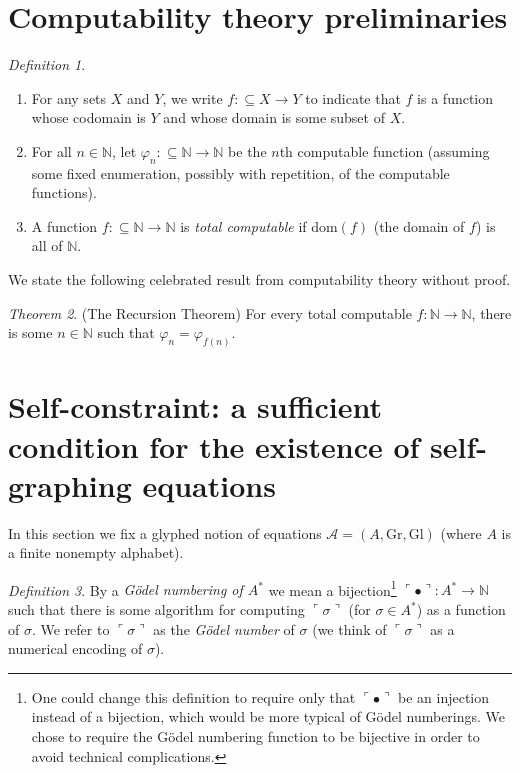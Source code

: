 \documentclass[table, svgnames, dvipsnames, letterpaper, 11pt]{report}
\theoremstyle{remark}
\newtheorem{theorem}{Theorem}
\newtheorem{definition}[theorem]{Definition}
\begin{document}
\section{Computability theory preliminaries}

\begin{definition}
  \begin{enumerate}
    \item
    For any sets $X$ and $Y$, we write $f:{\subseteq}X\to Y$ to indicate
    that $f$ is a function whose codomain is $Y$ and whose domain is
    some subset of $X$.
    \item
    For all $n\in\mathbb N$,
    let $\varphi_n:{\subseteq}\mathbb N\to \mathbb N$
    be the $n$th computable function
    (assuming some fixed enumeration, possibly with repetition,
    of the computable functions).
    \item
    A function $f:{\subseteq}\mathbb N\to\mathbb N$ is \emph{total computable}
    if $\mathrm{dom}(f)$ (the domain of $f$) is all of $\mathbb N$.
  \end{enumerate}
\end{definition}

We state the following celebrated result from computability theory
without proof.

\begin{theorem}
\label{recursionthm}
  (The Recursion Theorem)
  For every total computable $f:\mathbb N\to\mathbb N$, there is some
  $n\in\mathbb N$ such that $\varphi_n=\varphi_{f(n)}$.
\end{theorem}

\section{Self-constraint: a sufficient condition for the existence of self-graphing
equations}

In this section we fix a glyphed notion of equations
$\mathcal A=(A,\mathrm{Gr},\mathrm{Gl})$ (where $A$ is a finite nonempty
alphabet).

\begin{definition}
  By a \emph{G\"odel numbering of $A^*$} we mean a bijection\footnote{One could
  change this definition to require only that $\ulcorner\bullet\urcorner$ be
  an injection instead of a bijection, which would be more typical of
  G\"odel numberings. We chose to require the G\"odel numbering function to
  be bijective in order to avoid technical complications.}
  $\ulcorner\bullet\urcorner:A^*\to\mathbb N$ such that
  there is some algorithm for computing $\ulcorner\sigma\urcorner$
  (for $\sigma\in A^*$)
  as a function of $\sigma$.
  We refer to $\ulcorner\sigma\urcorner$ as the \emph{G\"odel number}
  of $\sigma$ (we think of $\ulcorner\sigma\urcorner$ as a numerical
  encoding of $\sigma$).
\end{definition}
\end{document}
